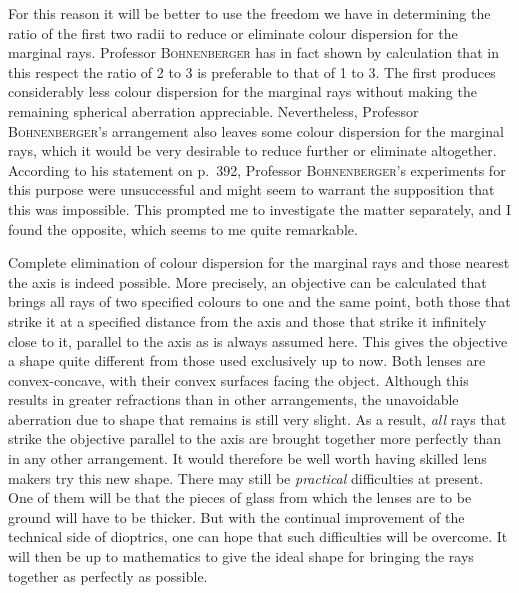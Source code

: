 For this reason it will be better to use the freedom we have in determining the ratio of the first two radii to reduce or eliminate colour dispersion for the marginal rays. Professor \textsc{Bohnenberger} has in fact shown by calculation that in this respect the ratio of 2 to 3 is preferable to that of 1 to 3. The first produces considerably less colour dispersion for the marginal rays without making the remaining spherical aberration appreciable. Nevertheless, Professor \textsc{Bohnenberger}'s arrangement also leaves some colour dispersion for the marginal rays,
which it would be very desirable to reduce further or eliminate altogether. According to his statement on p.\ 392, Professor \textsc{Bohnenberger}'s experiments for this purpose were unsuccessful and might seem to warrant the supposition that this was impossible. This prompted me to investigate the matter separately, and I found the opposite, which seems to me quite remarkable.

Complete elimination of colour dispersion for the marginal rays and those nearest the axis is indeed possible. More precisely, an objective can be calculated that brings all rays of two specified colours to one and the same point, both those that strike it at a specified distance from the axis and those that strike it infinitely close to it, parallel to the axis as is always assumed here. This gives the objective a shape quite different from those used exclusively up to now. Both lenses are convex-concave, with their convex surfaces facing the object. Although this results in greater refractions than in other arrangements, the unavoidable aberration due to shape that remains is still very slight. As a result, \textit{all} rays that strike the objective parallel to the axis are brought together more perfectly than in any other arrangement. It would therefore be well worth having skilled lens makers try this new shape. There may still be \textit{practical} difficulties at present. One of them will be that the pieces of glass from which the lenses are to be ground will have to be thicker. But with the continual improvement of the technical side of dioptrics, one can hope that such difficulties will be overcome. It will then be up to mathematics to give the ideal shape for bringing the rays together as perfectly as possible.

